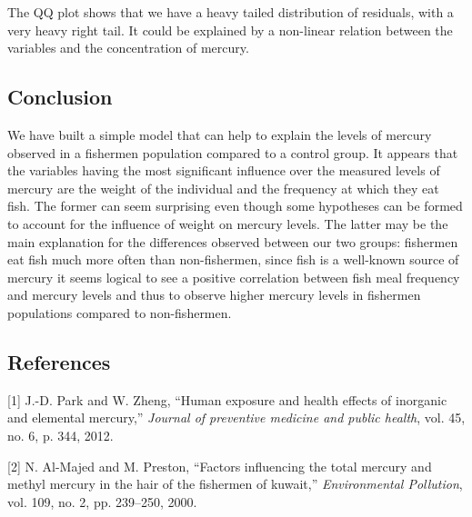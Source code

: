 \documentclass[12pt,]{article}
\begin{document}
The QQ plot shows that we have a heavy tailed distribution of residuals,
with a very heavy right tail. It could be explained by a non-linear
relation between the variables and the concentration of mercury.

\subsection{Conclusion}\label{conclusion}

We have built a simple model that can help to explain the levels of
mercury observed in a fishermen population compared to a control group.
It appears that the variables having the most significant influence over
the measured levels of mercury are the weight of the individual and the
frequency at which they eat fish. The former can seem surprising even
though some hypotheses can be formed to account for the influence of
weight on mercury levels. The latter may be the main explanation for the
differences observed between our two groups: fishermen eat fish much
more often than non-fishermen, since fish is a well-known source of
mercury it seems logical to see a positive correlation between fish meal
frequency and mercury levels and thus to observe higher mercury levels
in fishermen populations compared to non-fishermen.

\subsection*{References}\label{references}

\hypertarget{refs}{}
\hypertarget{ref-park2012human}{}
{[}1{]} J.-D. Park and W. Zheng, ``Human exposure and health effects of
inorganic and elemental mercury,'' \emph{Journal of preventive medicine
and public health}, vol. 45, no. 6, p. 344, 2012.

\hypertarget{ref-al2000factors}{}
{[}2{]} N. Al-Majed and M. Preston, ``Factors influencing the total
mercury and methyl mercury in the hair of the fishermen of kuwait,''
\emph{Environmental Pollution}, vol. 109, no. 2, pp. 239--250, 2000.
\end{document}
